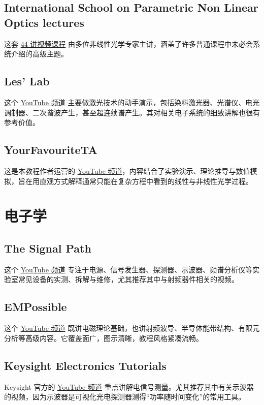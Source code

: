 \subsection*{International School on Parametric Non Linear Optics lectures}
这套 \href{https://www.youtube.com/@ispnlo9041/videos}{44 讲视频课程} 由多位非线性光学专家主讲，涵盖了许多普通课程中未必会系统介绍的高级主题。

\subsection*{Les' Lab}
这个 \href{https://www.youtube.com/@LesLaboratory/videos}{YouTube 频道} 主要做激光技术的动手演示，包括染料激光器、光谱仪、电光调制器、二次谐波产生，甚至超连续谱产生。其对相关电子系统的细致讲解也很有参考价值。

\subsection*{YourFavouriteTA}
这是本教程作者运营的 \href{https://www.youtube.com/@yourfavouriteta/videos}{YouTube 频道}，内容结合了实验演示、理论推导与数值模拟，旨在用直观方式解释通常只能在复杂方程中看到的线性与非线性光学过程。


\section{电子学}
\subsection*{The Signal Path}
这个 \href{https://www.youtube.com/@Thesignalpath/videos}{YouTube 频道} 专注于电源、信号发生器、探测器、示波器、频谱分析仪等实验室常见设备的实测、拆解与维修，尤其推荐其中与射频器件相关的视频。

\subsection*{EMPossible}
这个 \href{https://www.youtube.com/@empossible1577/playlists}{YouTube 频道} 既讲电磁理论基础，也讲射频波导、半导体能带结构、有限元分析等高级内容。它覆盖面广，图示清晰，教程风格紧凑流畅。

\subsection*{Keysight Electronics Tutorials}
Keysight 官方的 \href{https://www.youtube.com/@KeysightLabs/videos}{YouTube 频道} 重点讲解电信号测量。尤其推荐其中有关示波器的视频，因为示波器是可视化光电探测器测得“功率随时间变化”的常用工具。


